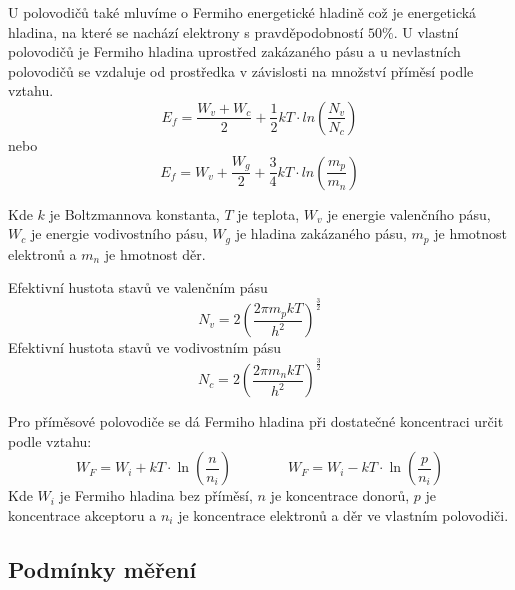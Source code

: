 \documentclass{article}
\begin{document}
U polovodičů také mluvíme o Fermiho energetické hladině což je energetická hladina, na které se nachází elektrony s pravděpodobností \(50\%\).
U vlastní polovodičů je Fermiho hladina uprostřed zakázaného pásu a u nevlastních polovodičů se vzdaluje od prostředka v závislosti na množství příměsí podle vztahu.
\begin{equation}
    E_f = \frac{W_v + W_c}{2} + \frac{1}{2}kT\cdot ln\left(\frac{N_v}{N_c}\right)
    \label{fermiho_hladina-1}
\end{equation}
nebo
\begin{equation}
    E_f = W_v + \frac{W_g}{2} + \frac{3}{4}kT\cdot ln\left(\frac{m_p}{m_n}\right)
    \label{fermiho_hladina-2}
\end{equation}

Kde \(k\) je Boltzmannova konstanta, \(T\) je teplota, \(W_v\) je energie valenčního pásu, \(W_c\) je energie vodivostního pásu, \(W_g\) je hladina zakázaného pásu, \(m_p\) je hmotnost elektronů a \(m_n\) je hmotnost děr.

Efektivní hustota stavů ve valenčním pásu
\begin{equation}
    N_v = 2\left(\frac{2\pi m_p kT }{h^2}\right)^{\frac{3}{2}}
    \label{efektivni_hustota_stavu_v}
\end{equation}
Efektivní hustota stavů ve vodivostním pásu
\begin{equation}
    N_c = 2\left(\frac{2\pi m_n kT }{h^2}\right)^{\frac{3}{2}}
    \label{efektivni_hustota_stavu_c}
\end{equation}

Pro příměsové polovodiče se dá Fermiho hladina při dostatečné koncentraci určit podle vztahu:
\begin{equation}
    W_F = W_i + kT\cdot \ln{\left(\frac{n}{n_i}\right)} \qquad \qquad W_F = W_i - kT\cdot \ln{\left(\frac{p}{n_i}\right)}
    \label{fermiho_hladina_primesi}
\end{equation}
Kde \(W_i\) je Fermiho hladina bez příměsí, \(n\) je koncentrace donorů, \(p\) je koncentrace akceptoru a \(n_i\) je koncentrace elektronů a děr ve vlastním polovodiči.


\newpage
\subsection*{Podmínky měření}

\end{document}
